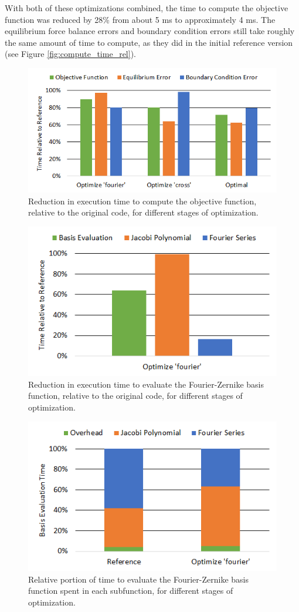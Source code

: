 \documentclass{article}
\begin{document}
With both of these optimizations combined, the time to compute the objective function was reduced by 28\% from about 5 ms to approximately 4 ms.
The equilibrium force balance errors and boundary condition errors still take roughly the same amount of time to compute, as they did in the initial reference version (see Figure \ref{fig:compute_time_rel}).

\begin{figure}[H]
	\centering
	\includegraphics[width=0.6\linewidth,center]{./figs/compute_time_opt.png}
	\caption{Reduction in execution time to compute the objective function, relative to the original code, for different stages of optimization.}
	\label{fig:compute_time_opt}
\end{figure}
%
\begin{figure}[H]
	\centering
	\includegraphics[width=0.6\linewidth,center]{./figs/compile_time_opt.png}
	\caption{Reduction in execution time to evaluate the Fourier-Zernike basis function, relative to the original code, for different stages of optimization.}
	\label{fig:compile_time_opt}
\end{figure}
%
\begin{figure}[H]
	\centering
	\includegraphics[width=0.6\linewidth,center]{./figs/compile_time_rel.png}
	\caption{Relative portion of time to evaluate the Fourier-Zernike basis function spent in each subfunction, for different stages of optimization.}
	\label{fig:compile_time_rel}
\end{figure}
\end{document}
